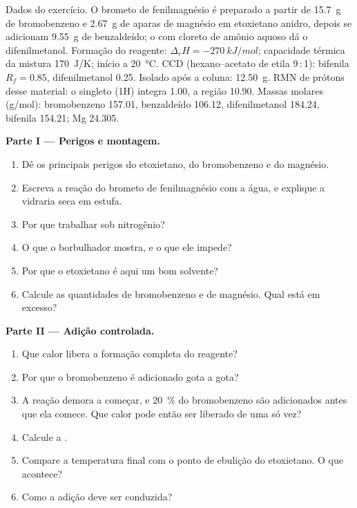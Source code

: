 \begin{problem}
\label{pb:b2:lab-techniques-2:1}
Dados do exercício. O brometo de fenilmagnésio é preparado a partir de \qty{15.7}{g} de bromobenzeno e
\qty{2.67}{g} de aparas de magnésio em etoxietano anidro, depois se adicionam \qty{9.55}{g} de
benzaldeído; o  com cloreto de amônio aquoso dá o difenilmetanol. Formação do reagente: $\Delta_rH =
\qty{-270}{kJ/mol}$; capacidade térmica da mistura \qty{170}{J/K}; início a \qty{20}{\degreeCelsius}. CCD
(hexano--acetato de etila 9\,:\,1): bifenila $R_f = 0.85$, difenilmetanol 0.25. Isolado após a coluna:
\qty{12.50}{g}. RMN de prótons desse material: o singleto  (1H) integra 1.00, a região
 10.90. Massas molares (\unit{g/mol}): bromobenzeno 157.01, benzaldeído 106.12, difenilmetanol
184.24, bifenila 154.21; Mg 24.305.

\medskip
\noindent\textbf{Parte I --- Perigos e montagem.}
\begin{enumerate}
  \item Dê os principais perigos do etoxietano, do bromobenzeno e do magnésio.
  \item Escreva a reação do brometo de fenilmagnésio com a água, e explique a vidraria seca em estufa.
  \item Por que trabalhar sob nitrogênio?
  \item O que o borbulhador mostra, e o que ele impede?
  \item Por que o etoxietano é aqui um bom solvente?
  \item Calcule as quantidades de bromobenzeno e de magnésio. Qual está em excesso?
\end{enumerate}

\medskip
\noindent\textbf{Parte II --- Adição controlada.}
\begin{enumerate}[resume]
  \item Que calor libera a formação completa do reagente?
  \item Por que o bromobenzeno é adicionado gota a gota?
  \item A reação demora a começar, e 20~\% do bromobenzeno são adicionados antes que ela comece. Que
        calor pode então ser liberado de uma só vez?
  \item Calcule a .
  \item Compare a temperatura final com o ponto de ebulição do etoxietano. O que acontece?
  \item Como a adição deve ser conduzida?
\end{enumerate}


\end{problem}
